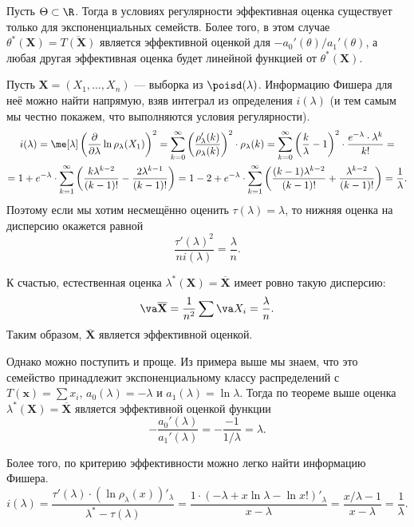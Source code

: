 \begin{theorem}[label=est_for_exp]{}{}
    Пусть $\Theta \subset \R$. Тогда в условиях регулярности эффективная оценка существует только для экспоненциальных семейств. Более того, в этом случае $\theta^*(\mathbf X) = \overline{T(\mathbf X)}$ является эффективной оценкой для $-a_0'(\theta) / a_1'(\theta)$, а любая другая эффективная оценка будет линейной функцией от $\theta^*(\mathbf X)$.
\end{theorem}

\begin{example}
    Пусть $\mathbf X = (X_1, \ldots, X_n)$ --- выборка из $\poisd(\lambda)$. Информацию Фишера для неё можно найти напрямую, взяв интеграл из определения $i(\lambda)$ (и тем самым мы честно покажем, что выполняются условия регулярности).
    \begin{gather*}
        i(\lambda) = \me[\lambda] \left(\frac{\partial}{\partial \lambda} \ln{\rho_{\lambda}(X_1)} \right)^2 = \sum_{k=0}^{\infty} \left(\frac{\rho_{\lambda}'(k)}{\rho_{\lambda}(k)}\right)^2 \cdot \rho_{\lambda}(k) = \sum_{k=0}^{\infty} \left(\frac{k}{\lambda} - 1\right)^2 \cdot \frac{e^{-\lambda} \cdot \lambda^k}{k!} = \\
        = 1 + e^{-\lambda}\cdot \sum_{k=1}^{\infty} \left(\frac{k\lambda^{k-2}}{(k-1)!} - \frac{2\lambda^{k-1}}{(k-1)!}\right) = 1 - 2 + e^{-\lambda}\cdot \sum_{k=1}^{\infty}\left(\frac{(k-1)\lambda^{k-2}}{(k-1)!} + \frac{\lambda^{k-2}}{(k-1)!}\right) = \frac{1}{\lambda}.
    \end{gather*}
    Поэтому если мы хотим несмещённо оценить $\tau(\lambda) = \lambda$, то нижняя оценка на дисперсию окажется равной
    \[
    \frac{\tau'(\lambda)^2}{ni(\lambda)} = \frac{\lambda}{n}.
    \]
    
    К счастью, естественная оценка $\lambda^*(\mathbf X) = \overline{\mathbf X}$ имеет ровно такую дисперсию:
    \[
    \va \overline{\mathbf X} = \frac{1}{n^2} \sum \va X_i = \frac{\lambda}{n}.
    \]
    Таким образом, $\overline{\mathbf X}$ является эффективной оценкой.
    
    Однако можно поступить и проще. Из примера выше мы знаем, что это семейство принадлежит экспоненциальному классу распределений с $T(\mathbf{x}) = \sum x_i$, $a_0(\lambda) = -\lambda$ и $a_1(\lambda) = \ln{\lambda}$. Тогда по теореме выше оценка $\lambda^*(\mathbf X) = \overline{\mathbf X}$ является эффективной оценкой функции
    \[
    -\frac{a_0'(\lambda)}{a_1'(\lambda)} = -\frac{-1}{1/\lambda} = \lambda.
    \]

    Более того, по критерию эффективности можно легко найти информацию Фишера.
    \[
    i(\lambda) = \frac{\tau'(\lambda)\cdot (\ln{\rho_{\lambda}(x)})'_{\lambda}}{\lambda^* - \tau(\lambda)} = \frac{1 \cdot (-\lambda + x\ln{\lambda} - \ln{x!})'_{\lambda}}{x - \lambda} = \frac{x / \lambda - 1}{x - \lambda} = \frac{1}{\lambda}.
    \]
    
\end{example}


